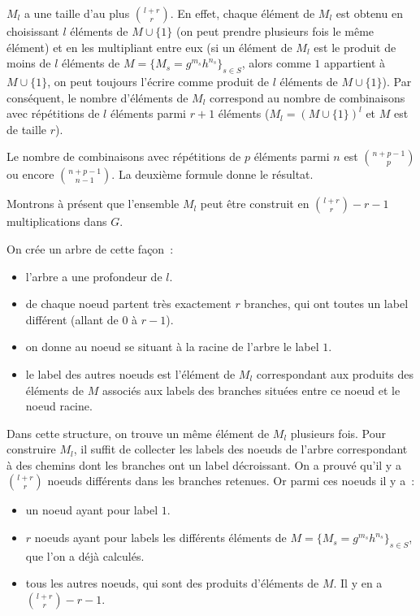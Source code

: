     $M_l$ a une taille d'au plus $\binom{l+r}{r}$. En effet, chaque élément de $M_l$ est obtenu en choisissant $l$ éléments de $M\cup\{1\}$ (on peut prendre plusieurs fois le même élément) et en les multipliant entre eux (si un élément de $M_l$ est le produit de moins de $l$ éléments de $M = \{M_s = g^{m_s} h^{n_s}\}_{s \in S}$, alors comme $1$ appartient à $M\cup\{1\}$, on peut toujours l'écrire comme produit de $l$ éléments de $M\cup\{1\}$). Par conséquent, le nombre d'éléments de $M_l$ correspond au nombre de combinaisons avec répétitions de $l$ éléments parmi $r + 1$ éléments ($M_l = (M\cup\{1\})^l$ et $M$ est de taille $r$).

    Le nombre de combinaisons avec répétitions de $p$ éléments parmi $n$ est $\binom{n+p-1}{p}$ ou encore $\binom{n+p-1}{n-1}$. La deuxième formule donne le résultat.

    Montrons à présent que l'ensemble $M_l$ peut être construit en $\binom{l+r}{r} - r - 1$ multiplications dans $G$.

    On crée un arbre de cette façon~:

    \begin{itemize}
      \item l'arbre a une profondeur de $l$.
      \item de chaque noeud partent très exactement $r$ branches, qui ont toutes un label différent (allant de $0$ à $r - 1$).
      \item on donne au noeud se situant à la racine de l'arbre le label $1$.
      \item le label des autres noeuds est l'élément de $M_l$ correspondant aux produits des éléments de $M$ associés aux labels des branches situées entre ce noeud et le noeud racine.
    \end{itemize}

    Dans cette structure, on trouve un même élément de $M_l$ plusieurs fois. Pour construire $M_l$, il suffit de collecter les labels des noeuds de l'arbre correspondant à des chemins dont les branches ont un label décroissant. On a prouvé qu'il y a $\binom{l+r}{r}$ noeuds différents dans les branches retenues. Or parmi ces noeuds il y a~:

    \begin{itemize}
      \item un noeud ayant pour label $1$.
      \item $r$ noeuds ayant pour labels les différents éléments de $M = \{M_s = g^{m_s} h^{n_s}\}_{s \in S}$, que l'on a déjà calculés.
      \item tous les autres noeuds, qui sont des produits d'éléments de $M$. Il y en a $\binom{l+r}{r} - r - 1$.
    \end{itemize}


